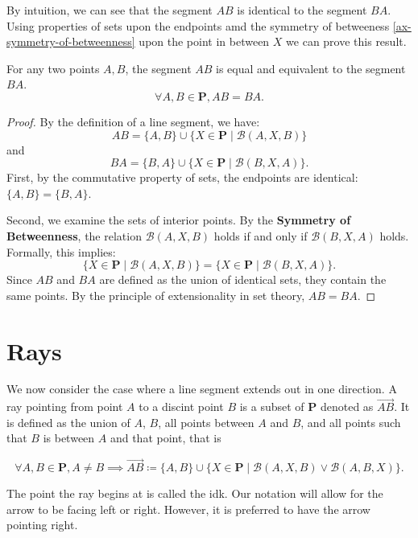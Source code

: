 \documentclass[../../../main/main.tex]{subfiles}
\begin{document}
By intuition, we can see that the segment $AB$ is identical to the segment $BA$. Using properties of sets upon the endpoints amd the symmetry of betweeness \ref{ax-symmetry-of-betweenness} upon the point in between $X$ we can prove this result.

\begin{theorem}
    For any two points $A, B$, the segment $AB$ is equal and equivalent to the segment $BA$.
    \[
    \forall A, B \in \mathbf{P}, AB = BA.
    \]
\end{theorem}
\begin{proof}
    By the definition of a line segment, we have:
    \[
    AB = \{A, B\} \cup \{ X \in \mathbf{P} \mid \mathcal{B}(A, X, B) \}
    \]
    and
    \[
    BA = \{B, A\} \cup \{ X \in \mathbf{P} \mid \mathcal{B}(B, X, A) \}.
    \]
    First, by the commutative property of sets, the endpoints are identical: $\{ A, B \} = \{ B, A \}$.

    Second, we examine the sets of interior points. By the \textbf{Symmetry of Betweenness}, the relation $\mathcal{B}(A, X, B)$ holds if and only if $\mathcal{B}(B, X, A)$ holds. Formally, this implies:
    \[
    \{X \in \mathbf{P} \mid \mathcal{B}(A, X, B)\} = \{X \in \mathbf{P} \mid \mathcal{B}(B, X, A)\}.
    \]
    Since $AB$ and $BA$ are defined as the union of identical sets, they contain the same points. By the principle of extensionality in set theory, $AB = BA$.
\end{proof}

\section{Rays}

We now consider the case where a line segment extends out in one direction. A ray pointing from point $A$ to a discint point $B$ is a subset of $\mathbf{P}$ denoted as $\overrightarrow{AB}$. It is defined as the union of $A$, $B$, all points between $A$ and $B$, and all points such that $B$ is between $A$ and that point, that is
\begin{definition}[Ray]
    \[
    \forall A, B \in \mathbf{P}, A \neq B \implies \overrightarrow{AB} \coloneqq \{A, B\} \cup \{X \in \mathbf{P} \mid \mathcal{B}(A, X, B) \lor \mathcal{B}(A, B, X)\}.
    \]
\end{definition}

The point the ray begins at is called the idk. Our notation will allow for the arrow to be facing left or right. However, it is preferred to have the arrow pointing right.
\end{document}

